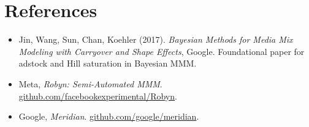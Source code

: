 \documentclass[a4paper,11pt]{article}
\begin{document}
\section{References}

\begin{itemize}
\item Jin, Wang, Sun, Chan, Koehler (2017).
\emph{Bayesian Methods for Media Mix Modeling with Carryover and Shape
Effects}, Google. Foundational paper for adstock and Hill saturation
in Bayesian MMM.
\item Meta, \emph{Robyn: Semi-Automated MMM}.
\href{https://github.com/facebookexperimental/Robyn}{github.com/facebookexperimental/Robyn}.
\item Google, \emph{Meridian}. \href{https://github.com/google/meridian}{github.com/google/meridian}.
\end{itemize}
\end{document}
